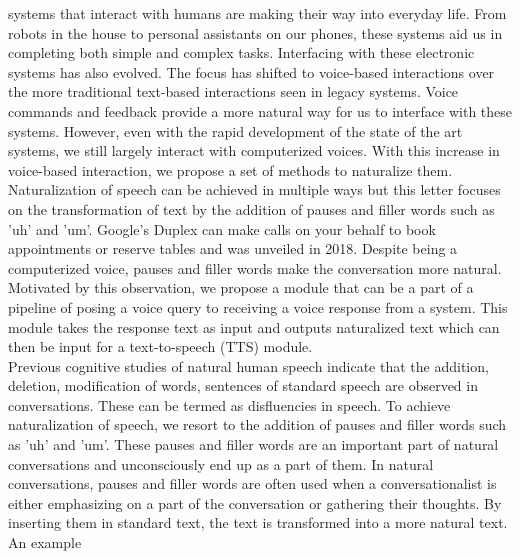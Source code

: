 \documentclass[journal]{IEEEtran}
\begin{document}
 systems that interact with humans are making their way into everyday life. From robots in the house to personal assistants on our phones, these systems aid us in completing both simple and complex tasks. Interfacing with these electronic systems has also evolved. The focus has shifted to voice-based interactions over the more traditional text-based interactions seen in legacy systems\cite{voice}. Voice commands and feedback provide a more natural way for us to interface with these systems. However, even with the rapid development of the state of the art systems, we still largely interact with computerized voices. With this increase in voice-based interaction, we propose a set of methods to naturalize them. Naturalization of speech can be achieved in multiple ways but this letter focuses on the transformation of text by the addition of pauses and filler words such as 'uh' and 'um'. Google's Duplex can make calls on your behalf to book appointments or reserve tables and was unveiled in 2018\cite{duplex}. Despite being a computerized voice, pauses and filler words make the conversation more natural. Motivated by this observation, we propose a module that can be a part of a pipeline of posing a voice query to receiving a voice response from a system. This module takes the response text as input and outputs naturalized text which can then be input for a text-to-speech (TTS) module. \\

Previous cognitive studies of natural human speech indicate that the addition, deletion, modification of words, sentences of standard speech are observed in conversations\cite{cognition}. These can be termed as disfluencies in speech. To achieve naturalization of speech, we resort to the addition of pauses and filler words such as 'uh' and 'um'. These pauses and filler words are an important part of natural conversations and unconsciously end up as a part of them. In natural conversations, pauses and filler words are often used when a conversationalist is either emphasizing on a part of the conversation or gathering their thoughts. By inserting them in standard text, the text is transformed into a more natural text. An example

\noindent{}
\\
\end{document}
